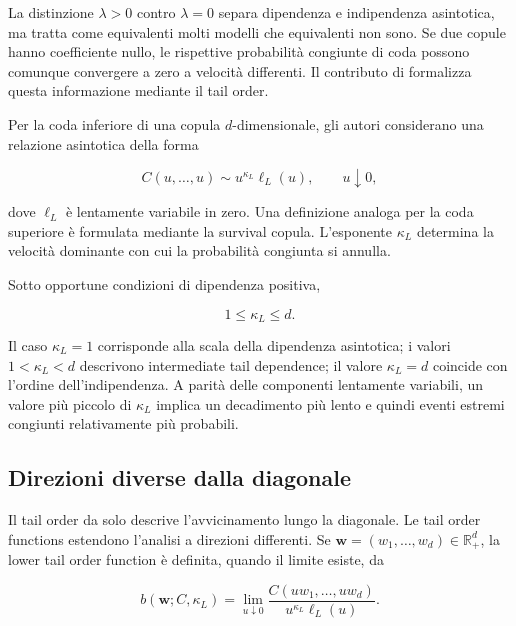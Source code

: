 \documentclass[12pt,a4paper,oneside]{book}
\begin{document}
La distinzione $\lambda>0$ contro $\lambda=0$ separa dipendenza e indipendenza
asintotica, ma tratta come equivalenti molti modelli che equivalenti non sono.
Se due copule hanno coefficiente nullo, le rispettive probabilità congiunte di
coda possono comunque convergere a zero a velocità differenti. Il contributo
di \textcite{huaJoe2011} formalizza questa informazione mediante il tail order.

Per la coda inferiore di una copula $d$-dimensionale, gli autori considerano
una relazione asintotica della forma

\begin{equation}
    C(u,\ldots,u)
    \sim u^{\kappa_L}\ell_L(u),
    \qquad u\downarrow 0,
    \label{eq:lower-tail-order}
\end{equation}

dove $\ell_L$ è lentamente variabile in zero. Una definizione analoga per la
coda superiore è formulata mediante la survival copula. L'esponente
$\kappa_L$ determina la velocità dominante con cui la probabilità congiunta
si annulla.

Sotto opportune condizioni di dipendenza positiva,

\begin{equation}
    1\leq \kappa_L\leq d.
\end{equation}

Il caso $\kappa_L=1$ corrisponde alla scala della dipendenza asintotica; i
valori $1<\kappa_L<d$ descrivono intermediate tail dependence; il valore
$\kappa_L=d$ coincide con l'ordine dell'indipendenza. A parità delle componenti
lentamente variabili, un valore più piccolo di $\kappa_L$ implica un
decadimento più lento e quindi eventi estremi congiunti relativamente più
probabili.

\subsection{Direzioni diverse dalla diagonale}

Il tail order da solo descrive l'avvicinamento lungo la diagonale. Le tail
order functions estendono l'analisi a direzioni differenti. Se
$\mathbf{w}=(w_1,\ldots,w_d)\in\mathbb{R}_+^d$, la lower tail order function è
definita, quando il limite esiste, da

\begin{equation}
    b(\mathbf{w};C,\kappa_L)
    =\lim_{u\downarrow0}
    \frac{C(uw_1,\ldots,uw_d)}
         {u^{\kappa_L}\ell_L(u)}.
    \label{eq:tail-order-function}
\end{equation}
\end{document}
